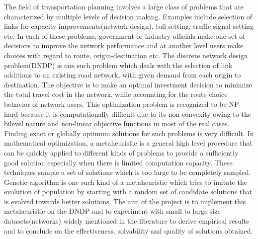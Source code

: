 \documentclass[a4paper, 12pt]{article}
\begin{document}
The field of transportation planning involves a large class of problems that are characterized by multiple levels of decision making. Examples include selection of links for capacity improvements(network design), toll setting, traffic signal setting etc. In each of these problems, government or industry officials make one set of decisions to improve the network performance and at another level users make choices with regard to route, origin-destination etc. The discrete network design problem(DNDP) is one such problem which deals with the selection of link additions to an existing road network, with given demand from each origin to destination. The objective is to make an optimal investment decision to minimize the total travel cost in the network, while accounting for the route choice behavior of network users. This optimization problem is recognized to be NP hard because it is computationally difficult due to its non convexity owing to the bilevel nature and non-linear objective functions in most of the real cases. Finding exact or globally optimum solutions for such problems is very difficult. In mathematical optimization, a metaheuristic is a general high level procedure that can be quickly applied to different kinds of problems to provide a sufficiently good solution especially when there is limited computation capacity. These techniques sample a set of solutions which is too large to be completely sampled. Genetic algorithm is one such kind of a metaheuristic which tries to imitate the evolution of population by starting with a random set of candidate solutions that is evolved towards better solutions. The aim of the project is to implement this metaheuristic on the DNDP and to experiment with small to large size datasets(networks) widely mentioned in the literature to derive empirical results and to conclude on the effectiveness, solvability and quality of solutions obtained.

\newpage
\thispagestyle{empty}
\tableofcontents
\newpage

\setcounter{page}{1}
\end{document}
